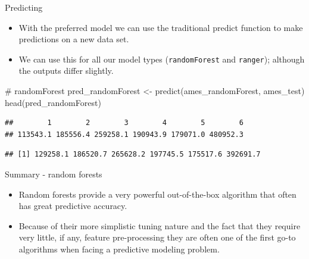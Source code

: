 \documentclass[
  10pt,
  ignorenonframetext,
]{beamer}
\newenvironment{Shaded}{}{}
\newcommand{\CommentTok}[1]{\textcolor[rgb]{0.00,0.50,0.00}{#1}}
\newcommand{\KeywordTok}[1]{\textcolor[rgb]{0.00,0.00,1.00}{#1}}
\newcommand{\NormalTok}[1]{#1}
\newcommand{\OperatorTok}[1]{#1}
\newcommand{\StringTok}[1]{\textcolor[rgb]{0.00,0.50,0.50}{#1}}
\providecommand{\tightlist}{%
  \setlength{\itemsep}{0pt}\setlength{\parskip}{0pt}}
\begin{document}
\begin{frame}[fragile]{Predicting}
\protect\hypertarget{predicting}{}

\begin{itemize}
\tightlist
\item
  With the preferred model we can use the traditional predict function
  to make predictions on a new data set.
\item
  We can use this for all our model types (\texttt{randomForest} and
  \texttt{ranger}); although the outputs differ slightly. 
\end{itemize}

\begin{Shaded}
\begin{Highlighting}[]
\CommentTok{# randomForest}
\NormalTok{pred_randomForest <-}\StringTok{ }\KeywordTok{predict}\NormalTok{(ames_randomForest, ames_test)}
\KeywordTok{head}\NormalTok{(pred_randomForest)}
\end{Highlighting}
\end{Shaded}

\begin{verbatim}
##        1        2        3        4        5        6 
## 113543.1 185556.4 259258.1 190943.9 179071.0 480952.3
\end{verbatim}

\begin{Shaded}
\end{Shaded}

\begin{verbatim}
## [1] 129258.1 186520.7 265628.2 197745.5 175517.6 392691.7
\end{verbatim}

\end{frame}

\begin{frame}{Summary - random forests}
\protect\hypertarget{summary---random-forests}{}

\begin{itemize}
\tightlist
\item
  Random forests provide a very powerful out-of-the-box algorithm that
  often has great predictive accuracy.
\item
  Because of their more simplistic tuning nature and the fact that they
  require very little, if any, feature pre-processing they are often one
  of the first go-to algorithms when facing a predictive modeling
  problem.
\end{itemize}

\end{frame}
\end{document}
